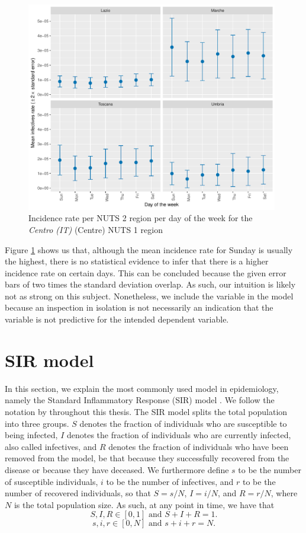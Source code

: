 \documentclass[12pt]{article}
\begin{document}
	\begin{figure}[ht]
	    \centering
	    \includegraphics[width=0.98\textwidth]{output/infective_rates_weekday_Centro (IT).pdf}
	    \caption{Incidence rate per NUTS 2 region per day of the week for the \textit{Centro (IT)} (Centre) NUTS 1 region}
	    \label{fig:incidence_Centro_weekday}
	\end{figure}
	
	Figure \ref{fig:incidence_Centro_weekday} shows us that, although the mean incidence rate for Sunday is usually the highest, there is no statistical evidence to infer that there is a higher incidence rate on certain days. This can be concluded because the given error bars of two times the standard deviation overlap. As such, our intuition is likely not as strong on this subject. Nonetheless, we include the variable in the model because an inspection in isolation is not necessarily an indication that the variable is not predictive for the intended dependent variable.
	
	\newpage
	\section{SIR model}\label{sec:sir_model}
	In this section, we explain the most commonly used model in epidemiology, namely the Standard Inflammatory Response (SIR) model \parencite{kermack1927contribution, anderson1992infectious}. We follow the notation by \textcite{keeling2011modeling} throughout this thesis. The SIR model splits the total population into three groups. $S$ denotes the fraction of individuals who are susceptible to being infected, $I$ denotes the fraction of individuals who are currently infected, also called infectives, and $R$ denotes the fraction of individuals who have been removed from the model, be that because they successfully recovered from the disease or because they have deceased. We furthermore define $s$ to be the number of susceptible individuals, $i$ to be the number of infectives, and $r$ to be the number of recovered individuals, so that $S = s/N$, $I = i/N$, and $R = r/N$, where $N$ is the total population size. As such, at any point in time, we have that
	\[S,I,R \in [0,1] \text{ and } S+I+R=1.\]
	\[s,i,r \in [0,N] \text{ and } s+i+r=N.\]
	
\end{document}
